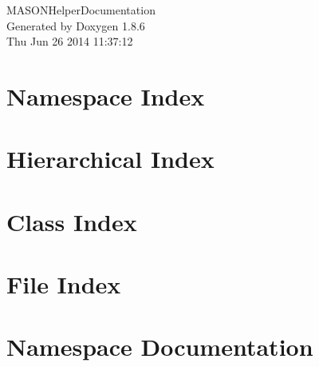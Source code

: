 \documentclass[twoside]{book}
\newcommand{\clearemptydoublepage}{%
  \newpage{\pagestyle{empty}\cleardoublepage}%
}
\begin{document}
\hypersetup{pageanchor=false}
\begin{titlepage}
\vspace*{7cm}
\begin{center}%
{\Large M\-A\-S\-O\-N\-Helper\-Documentation }\\
\vspace*{1cm}
{\large Generated by Doxygen 1.8.6}\\
\vspace*{0.5cm}
{\small Thu Jun 26 2014 11:37:12}\\
\end{center}
\end{titlepage}
\clearemptydoublepage
\tableofcontents
\clearemptydoublepage
{}
\hypersetup{pageanchor=true}

\chapter{Namespace Index}

\chapter{Hierarchical Index}

\chapter{Class Index}

\chapter{File Index}

\chapter{Namespace Documentation}














\end{document}
